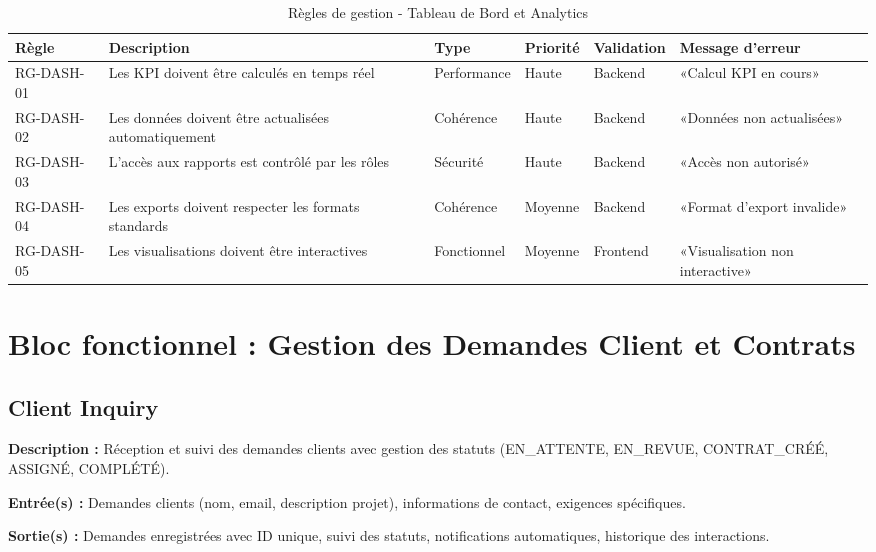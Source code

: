 \begin{table}[H]
\centering
\footnotesize
\begin{tabular}{|p{1.5cm}|p{3.5cm}|p{1.5cm}|p{1.5cm}|p{2cm}|p{2.5cm}|}
\hline
\textbf{Règle} & \textbf{Description} & \textbf{Type} & \textbf{Priorité} & \textbf{Validation} & \textbf{Message d'erreur} \\
\hline
RG-DASH-01 & Les KPI doivent être calculés en temps réel & Performance & Haute & Backend & «Calcul KPI en cours» \\
\hline
RG-DASH-02 & Les données doivent être actualisées automatiquement & Cohérence & Haute & Backend & «Données non actualisées» \\
\hline
RG-DASH-03 & L'accès aux rapports est contrôlé par les rôles & Sécurité & Haute & Backend & «Accès non autorisé» \\
\hline
RG-DASH-04 & Les exports doivent respecter les formats standards & Cohérence & Moyenne & Backend & «Format d'export invalide» \\
\hline
RG-DASH-05 & Les visualisations doivent être interactives & Fonctionnel & Moyenne & Frontend & «Visualisation non interactive» \\
\hline
\end{tabular}
\caption{Règles de gestion - Tableau de Bord et Analytics}
\label{tab:rg_dashboard}
\end{table}


\section{Bloc fonctionnel : Gestion des Demandes Client et Contrats}

\subsection{Client Inquiry}
\textbf{Description :} Réception et suivi des demandes clients avec gestion des statuts (EN_ATTENTE, EN_REVUE, CONTRAT_CRÉÉ, ASSIGNÉ, COMPLÉTÉ).

\textbf{Entrée(s) :} Demandes clients (nom, email, description projet), informations de contact, exigences spécifiques.

\textbf{Sortie(s) :} Demandes enregistrées avec ID unique, suivi des statuts, notifications automatiques, historique des interactions.

